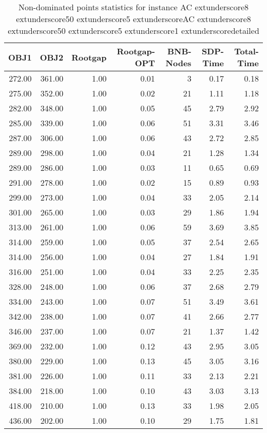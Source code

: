 \begin{table}
\caption{Non-dominated points statistics for instance AC	extunderscore8	extunderscore50	extunderscore5	extunderscoreAC	extunderscore8	extunderscore50	extunderscore5	extunderscore1	extunderscoredetailed}
\label{tab:stats/AC_8_50_5_AC_8_50_5_1_detailed}
\begin{tabular}{rrrrrrr}
\toprule
OBJ1 & OBJ2 & Rootgap & Rootgap-OPT & BNB-Nodes & SDP-Time & Total-Time \\
\midrule
272.00 & 361.00 & 1.00 & 0.01 & 3 & 0.17 & 0.18 \\
275.00 & 352.00 & 1.00 & 0.02 & 21 & 1.11 & 1.18 \\
282.00 & 348.00 & 1.00 & 0.05 & 45 & 2.79 & 2.92 \\
285.00 & 339.00 & 1.00 & 0.06 & 51 & 3.31 & 3.46 \\
287.00 & 306.00 & 1.00 & 0.06 & 43 & 2.72 & 2.85 \\
289.00 & 298.00 & 1.00 & 0.04 & 21 & 1.28 & 1.34 \\
289.00 & 286.00 & 1.00 & 0.03 & 11 & 0.65 & 0.69 \\
291.00 & 278.00 & 1.00 & 0.02 & 15 & 0.89 & 0.93 \\
299.00 & 273.00 & 1.00 & 0.04 & 33 & 2.05 & 2.14 \\
301.00 & 265.00 & 1.00 & 0.03 & 29 & 1.86 & 1.94 \\
313.00 & 261.00 & 1.00 & 0.06 & 59 & 3.69 & 3.85 \\
314.00 & 259.00 & 1.00 & 0.05 & 37 & 2.54 & 2.65 \\
314.00 & 256.00 & 1.00 & 0.04 & 27 & 1.84 & 1.91 \\
316.00 & 251.00 & 1.00 & 0.04 & 33 & 2.25 & 2.35 \\
328.00 & 248.00 & 1.00 & 0.06 & 37 & 2.68 & 2.79 \\
334.00 & 243.00 & 1.00 & 0.07 & 51 & 3.49 & 3.61 \\
342.00 & 238.00 & 1.00 & 0.07 & 41 & 2.66 & 2.77 \\
346.00 & 237.00 & 1.00 & 0.07 & 21 & 1.37 & 1.42 \\
369.00 & 232.00 & 1.00 & 0.12 & 43 & 2.95 & 3.05 \\
380.00 & 229.00 & 1.00 & 0.13 & 45 & 3.05 & 3.16 \\
381.00 & 226.00 & 1.00 & 0.11 & 33 & 2.13 & 2.21 \\
384.00 & 218.00 & 1.00 & 0.10 & 43 & 3.03 & 3.13 \\
418.00 & 210.00 & 1.00 & 0.13 & 33 & 1.98 & 2.05 \\
436.00 & 202.00 & 1.00 & 0.10 & 29 & 1.75 & 1.81 \\
\bottomrule
\end{tabular}
\end{table}
